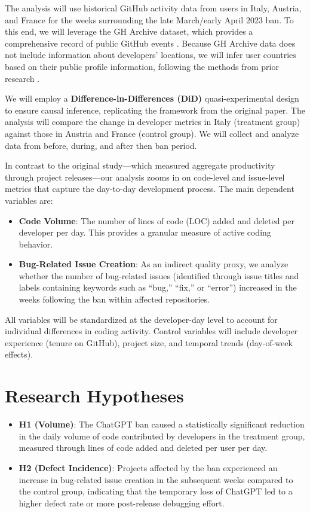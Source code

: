 The analysis will use historical GitHub activity data from users in Italy, Austria, and France for the weeks surrounding the late March/early April 2023 ban. To this end, we will leverage the GH Archive dataset, which provides a comprehensive record of public GitHub events \cite{github_archive}. Because GH Archive data does not include information about developers’ locations, we will infer user countries based on their public profile information, following the methods from prior research \cite{Kreitmeir2023}.

We will employ a \textbf{Difference-in-Differences (DiD)} quasi-experimental design to ensure causal inference, replicating the framework from the original paper. The analysis will compare the change in developer metrics in Italy (treatment group) against those in Austria and France (control group). We will collect and analyze data from before, during, and after then ban period.

In contrast to the original study—which measured aggregate productivity through project releases—our analysis zooms in on code-level and issue-level metrics that capture the day-to-day development process. The main dependent variables are:

\begin{itemize}
  \item \textbf{Code Volume}: The number of lines of code (LOC) added and deleted per developer per day. This provides a granular measure of active coding behavior.
  \item \textbf{Bug-Related Issue Creation}: As an indirect quality proxy, we analyze whether the number of bug-related issues (identified through issue titles and labels containing keywords such as “bug,” “fix,” or “error”) increased in the weeks following the ban within affected repositories.
\end{itemize}

All variables will be standardized at the developer-day level to account for individual differences in coding activity. Control variables will include developer experience (tenure on GitHub), project size, and temporal trends (day-of-week effects).


\section*{Research Hypotheses}

\begin{itemize}
  \item \textbf{H1 (Volume)}: The ChatGPT ban caused a statistically significant reduction in the daily volume of code contributed by developers in the treatment group, measured through lines of code added and deleted per user per day.
  \item \textbf{H2 (Defect Incidence)}: Projects affected by the ban experienced an increase in bug-related issue creation in the subsequent weeks compared to the control group, indicating that the temporary loss of ChatGPT led to a higher defect rate or more post-release debugging effort.
\end{itemize}


